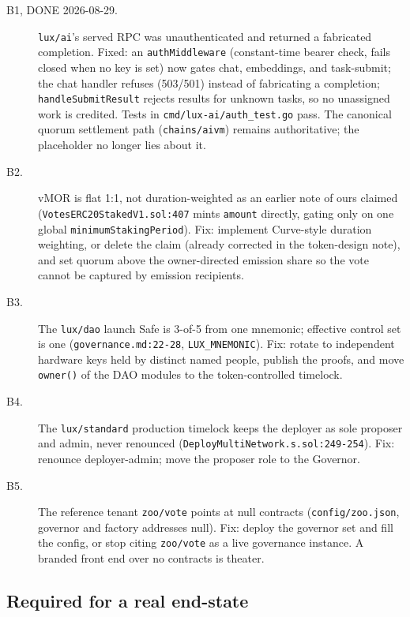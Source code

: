 \documentclass[11pt,a4paper]{article}
\newcommand{\code}[1]{\texttt{\small #1}}
\begin{document}
\begin{description}
  \item[B1, DONE 2026-08-29.] \code{lux/ai}'s served RPC was unauthenticated and returned a
    fabricated completion. Fixed: an \code{authMiddleware} (constant-time bearer check, fails
    closed when no key is set) now gates chat, embeddings, and task-submit; the chat handler
    refuses (503/501) instead of fabricating a completion; \code{handleSubmitResult} rejects
    results for unknown tasks, so no unassigned work is credited. Tests in
    \code{cmd/lux-ai/auth\_test.go} pass. The canonical quorum settlement path
    (\code{chains/aivm}) remains authoritative; the placeholder no longer lies about it.
  \item[B2.] vMOR is flat 1:1, not duration-weighted as an earlier note of ours claimed
    (\code{VotesERC20StakedV1.sol:407} mints \code{amount} directly, gating only on one global
    \code{minimumStakingPeriod}). Fix: implement Curve-style duration weighting, or delete the
    claim (already corrected in the token-design note), and set quorum above the owner-directed
    emission share so the vote cannot be captured by emission recipients.
  \item[B3.] The \code{lux/dao} launch Safe is 3-of-5 from one mnemonic; effective control set
    is one (\code{governance.md:22-28}, \code{LUX\_MNEMONIC}). Fix: rotate to independent
    hardware keys held by distinct named people, publish the proofs, and move \code{owner()} of
    the DAO modules to the token-controlled timelock.
  \item[B4.] The \code{lux/standard} production timelock keeps the deployer as sole proposer and
    admin, never renounced (\code{DeployMultiNetwork.s.sol:249-254}). Fix: renounce
    deployer-admin; move the proposer role to the Governor.
  \item[B5.] The reference tenant \code{zoo/vote} points at null contracts
    (\code{config/zoo.json}, governor and factory addresses null). Fix: deploy the governor set
    and fill the config, or stop citing \code{zoo/vote} as a live governance instance. A
    branded front end over no contracts is theater.
\end{description}

\subsection{Required for a real end-state}
\end{document}
